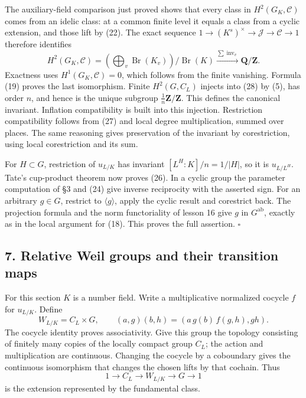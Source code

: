 \documentclass[11pt,a4paper]{article}
\begin{document}
The auxiliary-field comparison just proved shows that every class in
\(H^2(G_K,\mathcal C)\) comes from an idelic class: at a common finite
level it equals a class from a cyclic extension, and those lift by (22).
The exact sequence \(1\to(K^s)^\times\to\mathcal J\to\mathcal C\to1\)
therefore identifies \[
H^2(G_K,\mathcal C)
=\left(\bigoplus_v\operatorname{Br}(K_v)\right)/\operatorname{Br}(K)
\xrightarrow{\sum\operatorname{inv}_v}\mathbf Q/\mathbf Z.
\tag{28}
\] Exactness uses \(H^1(G_K,\mathcal C)=0\), which follows from the
finite vanishing. Formula (19) proves the last isomorphism. Finite
\(H^2(G,C_L)\) injects into (28) by (5), has order \(n\), and hence is
the unique subgroup \(\tfrac1n\mathbf Z/\mathbf Z\). This defines the
canonical invariant. Inflation compatibility is built into this
injection. Restriction compatibility follows from (27) and local degree
multiplication, summed over places. The same reasoning gives
preservation of the invariant by corestriction, using local
corestriction and its sum.

For \(H\subset G\), restriction of \(u_{L/K}\) has invariant
\([L^H:K]/n=1/|H|\), so it is \(u_{L/L^H}\). Tate's cup-product theorem
now proves (26). In a cyclic group the parameter computation of §3 and
(24) give inverse reciprocity with the asserted sign. For an arbitrary
\(g\in G\), restrict to \(\langle g\rangle\), apply the cyclic result
and corestrict back. The projection formula and the norm functoriality
of lesson 16 give \(g\) in \(G^{\mathrm{ab}}\), exactly as in the local
argument for (18). This proves the full assertion. \(\square\)

\subsection{7. Relative Weil groups and their transition
maps}\label{relative-weil-groups-and-their-transition-maps}

For this section \(K\) is a number field. Write a multiplicative
normalized cocycle \(f\) for \(u_{L/K}\). Define \[
W_{L/K}=C_L\times G,
\qquad (a,g)(b,h)=(a\,g(b)\,f(g,h),gh).
\tag{29}
\] The cocycle identity proves associativity. Give this group the
topology consisting of finitely many copies of the locally compact group
\(C_L\); the action and multiplication are continuous. Changing the
cocycle by a coboundary gives the continuous isomorphism that changes
the chosen lifts by that cochain. Thus \[
1\to C_L\to W_{L/K}\to G\to1
\tag{30}
\] is the extension represented by the fundamental class.
\end{document}
